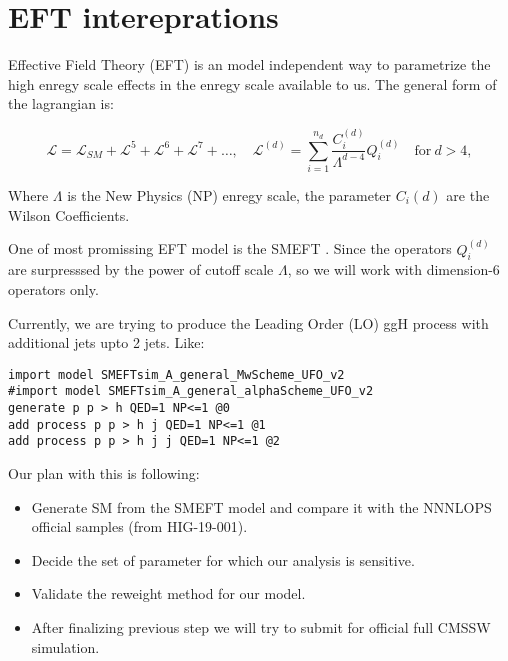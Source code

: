 \section{EFT intereprations}

Effective Field Theory (EFT) is an model independent way to parametrize the high enregy scale effects in the enregy scale available to us. The general form of the lagrangian is:

\begin{equation}
    \mathcal{L} = \mathcal{L}_{SM} + \mathcal{L}^{5} + \mathcal{L}^{6} + \mathcal{L}^{7} + \ldots,\quad \mathcal{L}^{(d)} = \sum_{i=1}^{n_d} \frac{C_i^{(d)}}{\Lambda^{d-4}}Q_i^{(d)} \quad \textrm{for}~ d>4,
\end{equation}

Where $\Lambda$ is the New Physics (NP) enregy scale, the parameter $C_{i}{(d)}$ are the Wilson Coefficients.

One of most promissing EFT model is the SMEFT \cite{Brivio:2017btx,Aebischer:2017ugx}. Since the operators $Q_{i}^{(d)}$ are surpresssed by the power of cutoff scale $\Lambda$, so we will work with dimension-6 operators only.

Currently, we are trying to produce the Leading Order (LO) ggH process with additional jets upto 2 jets. Like:

\begin{verbatim}
import model SMEFTsim_A_general_MwScheme_UFO_v2
#import model SMEFTsim_A_general_alphaScheme_UFO_v2
generate p p > h QED=1 NP<=1 @0
add process p p > h j QED=1 NP<=1 @1
add process p p > h j j QED=1 NP<=1 @2
\end{verbatim}

Our plan with this is following:

\begin{itemize}
    \item Generate SM from the SMEFT model and compare it with the NNNLOPS official samples (from HIG-19-001).
    \item Decide the set of parameter for which our analysis is sensitive.
    \item Validate the reweight method for our model.
    \item After finalizing previous step we will try to submit for official full CMSSW simulation.
\end{itemize}